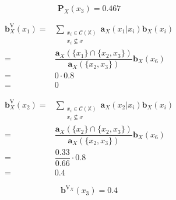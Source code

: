 \begin{equation*}
    \mathbf{P}_X(x_3) = 0.467
\end{equation*}

\begin{equation*}
    \begin{array}{rl}
        \mathbf{b}^{\mathrm{V}}_X(x_1) = & \sum\limits_{\substack{x_i \in \mathcal{C}(\mathbb{X}) \\ x_i \nsubseteq x}} \mathbf{a}_X(x_1 | x_i) \mathbf{b}_X(x_i) \\
                                       = & \dfrac{\mathbf{a}_X(\{x_1\} \cap \{x_2, x_3\})}{\mathbf{a}_X(\{x_2, x_3\})} \mathbf{b}_X(x_6) \\
                                       = & 0 \cdot 0.8 \\
                                       = & 0
    \end{array}
\end{equation*}

\begin{equation*}
    \begin{array}{rl}
        \mathbf{b}^{\mathrm{V}}_X(x_2) = & \sum\limits_{\substack{x_i \in \mathcal{C}(\mathbb{X}) \\ x_i \nsubseteq x}} \mathbf{a}_X(x_2 | x_i) \mathbf{b}_X(x_i) \\
                                       = & \dfrac{\mathbf{a}_X(\{x_2\} \cap \{x_2, x_3\})}{\mathbf{a}_X(\{x_2, x_3\})} \mathbf{b}_X(x_6) \\
                                       = & \dfrac{0.33}{0.66} \cdot 0.8 \\
                                       = & 0.4
    \end{array}
\end{equation*}

\begin{equation*}
    \mathbf{b}^{\mathrm{V}_X}(x_3) = 0.4
\end{equation*}

